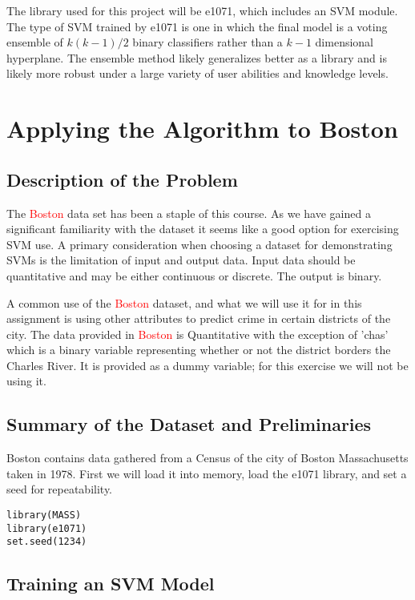 \documentclass[a4paper,man,natbib]{apa6}
\begin{document}
The library used for this project will be e1071, which includes an SVM module. The type of SVM trained by e1071 is one in which the final model is a voting ensemble of $k(k-1)/2$ binary classifiers rather than a $k-1$ dimensional hyperplane. The ensemble method likely generalizes better as a library and is likely more robust under a large variety of user abilities and knowledge levels.

\clearpage

\section{Applying the Algorithm to Boston}
\subsection{Description of the Problem}

The \textcolor{red}{Boston} data set has been a staple of this course. As we have gained a significant familiarity with the dataset it seems like a good option for exercising SVM use. A primary consideration when choosing a dataset for demonstrating SVMs is the limitation of input and output data. Input data should be quantitative and may be either continuous or discrete. The output is binary. 

A common use of the \textcolor{red}{Boston} dataset, and what we will use it for in this assignment is using other attributes to predict crime in certain districts of the city. The data provided in \textcolor{red}{Boston} is Quantitative with the exception of 'chas' which is a binary variable representing whether or not the district borders the Charles River. It is provided as a dummy variable; for this exercise we will not be using it.

\subsection{Summary of the Dataset and Preliminaries}

Boston contains data gathered from a Census of the city of Boston Massachusetts taken in 1978. First we will load it into memory, load the e1071 library, and set a seed for repeatability. 

\begin{verbatim}
library(MASS)
library(e1071)
set.seed(1234)
\end{verbatim}

\subsection{Training an SVM Model}
\end{document}
